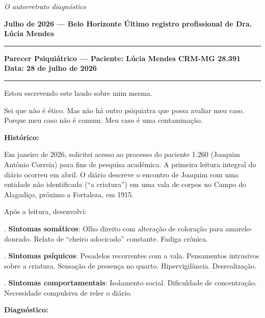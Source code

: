 
\noindent \textit{O autorretrato diagnóstico}

\noindent \textbf{Julho de 2026 --- Belo Horizonte}
\textbf{Último registro profissional de Dra. Lúcia Mendes}

\vspace{0.5em}\noindent\rule{\textwidth}{0.5pt}\vspace{0.5em}

\noindent \textbf{Parecer Psiquiátrico --- Paciente: Lúcia Mendes}
\textbf{CRM-MG 28.391}
\textbf{Data: 28 de julho de 2026}

\vspace{0.5em}\noindent\rule{\textwidth}{0.5pt}\vspace{0.5em}

\noindent Estou escrevendo este laudo sobre mim mesma.

\noindent Sei que não é ético. Mas não há outro psiquiatra que possa avaliar meu caso. Porque meu caso não é comum. Meu caso é uma contaminação.

\noindent \textbf{Histórico:}

\noindent Em janeiro de 2026, solicitei acesso ao processo do paciente 1.260 (Joaquim Antônio Correia) para fins de pesquisa acadêmica. A primeira leitura integral do diário ocorreu em abril. O diário descreve o encontro de Joaquim com uma entidade não identificada (\textquotedblleft{}a criatura\textquotedblright{}) em uma vala de corpos no Campo do Alagadiço, próximo a Fortaleza, em 1915.

\noindent Após a leitura, desenvolvi:

. \textbf{Sintomas somáticos}: Olho direito com alteração de coloração para amarelo-dourado. Relato de \textquotedblleft{}cheiro adocicado\textquotedblright{} constante. Fadiga crônica.

. \textbf{Sintomas psíquicos}: Pesadelos recorrentes com a vala. Pensamentos intrusivos sobre a criatura. Sensação de presença no quarto. Hipervigilância. Desrealização.

. \textbf{Sintomas comportamentais}: Isolamento social. Dificuldade de concentração. Necessidade compulsiva de reler o diário.

\noindent \textbf{Diagnóstico:}

